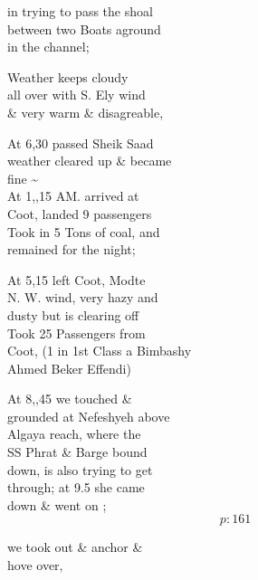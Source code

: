 \documentclass{report}
\begin{document}


	\par{
 	in trying to pass the shoal\ \\between two Boats aground\ \\in the channel;\ \\
	}

	\par{
 	Weather keeps cloudy\ \\all over with S. Ely wind\ \\\& very warm \& disagreable,\ \\
	}

	\par{
 	At 6,30 passed Sheik Saad\ \\weather cleared up \& became\ \\fine \~{}\ \\At 1,,15 AM. arrived at\ \\Coot, landed 9 passengers\ \\Took in 5 Tons of coal, and\ \\remained for the night;\ \\
	}

	\par{
 	At 5,15 left Coot, Modte\ \\N. W. wind, very hazy and\ \\dusty but is clearing off\ \\Took 25 Passengers from\ \\Coot, (1 in 1st Class a Bimbashy\ \\Ahmed Beker Effendi)\ \\
	}

	\par{
 	At 8,,45 we touched \&\ \\grounded at Nefeshyeh above\ \\Algaya reach, where the\ \\SS Phrat \& Barge bound\ \\down, is also trying to get\ \\through; at 9.5 she came\ \\down \& went on ;\ \\
  \[p: 161 \]

	}


	\par{
 	we took out \& anchor \&\ \\hove over,\ \\
	}
\end{document}
